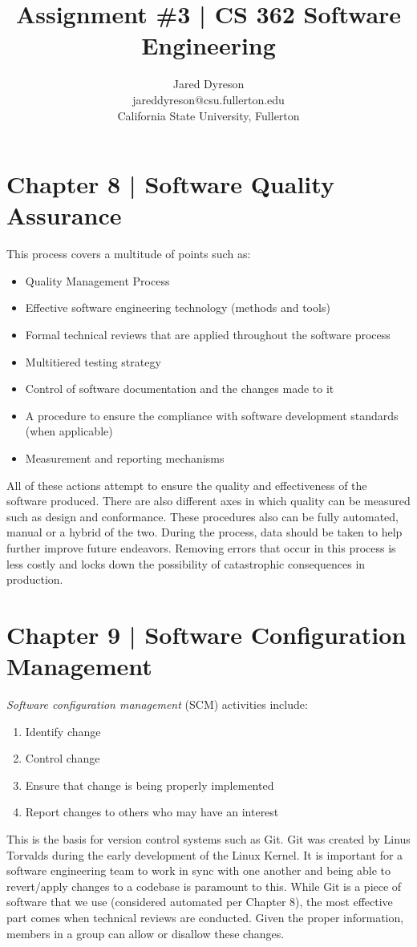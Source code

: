 \documentclass{article}
\title{Assignment \#3 | CS 362 Software Engineering}
\author{Jared Dyreson \\
        jareddyreson@csu.fullerton.edu \\
        California State University, Fullerton}
\date
\begin{document}
\maketitle
\tableofcontents

\newpage

\section{Chapter 8 | Software Quality Assurance}
This process covers a multitude of points such as:

\begin{itemize}
\item Quality Management Process
\item Effective software engineering technology (methods and tools)
\item Formal technical reviews that are applied throughout the software process
\item Multitiered testing strategy
\item Control of software documentation and the changes made to it
\item A procedure to ensure the compliance with software development standards (when applicable)
\item Measurement and reporting mechanisms
\end{itemize}

All of these actions attempt to ensure the quality and effectiveness of the software produced.
There are also different axes in which quality can be measured such as design and conformance.
These procedures also can be fully automated, manual or a hybrid of the two.
During the process, data should be taken to help further improve future endeavors.
Removing errors that occur in this process is less costly and locks down the possibility of catastrophic consequences in production.

\section{Chapter 9 | Software Configuration Management}

\emph{Software configuration management} (SCM) activities include:

\begin{enumerate}
\item Identify change
\item Control change
\item Ensure that change is being properly implemented
\item Report changes to others who may have an interest 
\end{enumerate}

This is the basis for version control systems such as Git.
Git was created by Linus Torvalds during the early development of the Linux Kernel.
It is important for a software engineering team to work in sync with one another and being able to revert/apply changes to a codebase is paramount to this.
While Git is a piece of software that we use (considered automated per Chapter 8), the most effective part comes when technical reviews are conducted.
Given the proper information, members in a group can allow or disallow these changes.
\end{document}
